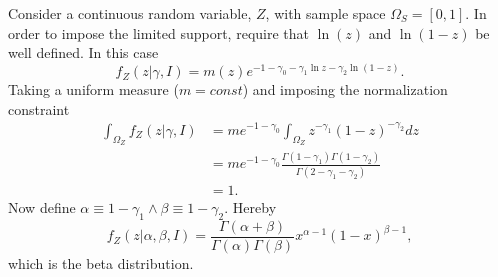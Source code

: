 \begin{example}
	Consider a continuous random variable, $Z$, with sample space $\Omega_S =[0,1]$. In order to impose the limited support, require that $\ln(z)$ and $\ln(1-z)$ be well defined. In this case
	\begin{equation}
		f_Z(z|\gamma,I)=m(z)e^{-1-\gamma_0-\gamma_1\ln z-\gamma_2\ln(1-z)}.
	\end{equation}
	Taking a uniform measure ($m= const$) and imposing the normalization constraint
	\begin{equation}
		\begin{split}
			\int_{\Omega_Z} f_Z(z|\gamma,I) &= me^{-1-\gamma_0}\int_{\Omega_Z} z^{-\gamma_1}(1-z)^{-\gamma_2}dz\\
			&= me^{-1-\gamma_0}\frac{\Gamma(1-\gamma_1)\Gamma(1-\gamma_2)}{\Gamma(2-\gamma_1-\gamma_2)}\\
			&=1.
		\end{split}
	\end{equation}
	Now define $\alpha \equiv 1-\gamma_1\wedge \beta \equiv 1-\gamma_2$. Hereby
	\begin{equation}
		f_Z(z|\alpha,\beta,I) = \frac{\Gamma(\alpha+\beta)}{\Gamma(\alpha)\Gamma(\beta)}x^{\alpha-1}(1-x)^{\beta-1},
	\end{equation}
	which is the beta distribution. 
\end{example}


